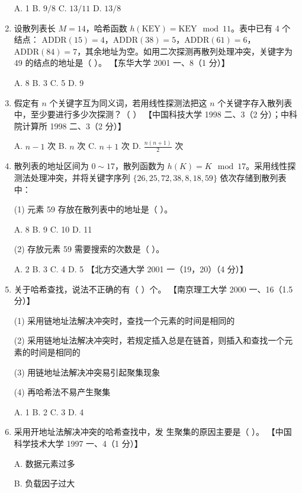 \documentclass[lang=cn,newtx,10pt,scheme=chinese]{../../elegantbook}
\begin{document}
\begin{enumerate}
    A. 1 \quad B. $9/8$ \quad C. $13/11$ \quad D. $13/8$  

    \item 设散列表长 $M = 14$，哈希函数 $h(\text{KEY}) = \text{KEY} \mod 11$。表中已有 4 个结点：  
    $\text{ADDR}(15) = 4$，$\text{ADDR}(38) = 5$，$\text{ADDR}(61) = 6$，$\text{ADDR}(84) = 7$，其余地址为空。如用二次探测再散列处理冲突，关键字为 49 的结点的地址是（ ）。  
    【东华大学 2001 一、8（1 分）】 

    A. 8 \quad B. 3 \quad C. 5 \quad D. 9  

    \item 假定有 $n$ 个关键字互为同义词，若用线性探测法把这 $n$ 个关键字存入散列表中，至少要进行多少次探测？（ ）  
    【中国科技大学 1998 二、3（2 分）；中科院计算所 1998 二、3（2 分）】  

    A. $n-1$ 次 \quad B. $n$ 次 \quad C. $n+1$ 次 \quad D. $\frac{n(n+1)}{2}$ 次  

    \item 散列表的地址区间为 $0 \sim 17$，散列函数为 $h(K) = K \mod 17$。采用线性探测法处理冲突，并将关键字序列 $\{26, 25, 72, 38, 8, 18, 59\}$ 依次存储到散列表中：  
    
    (1) 元素 59 存放在散列表中的地址是（ ）。 

    A. 8 \quad B. 9 \quad C. 10 \quad D. 11  
   
    (2) 存放元素 59 需要搜索的次数是（ ）。  
   
    A. 2 \quad B. 3 \quad C. 4 \quad D. 5  
    【北方交通大学 2001 一（19，20）（4 分）】  

    \item 关于哈希查找，说法不正确的有（ ）个。  
    【南京理工大学 2000 一、16（1.5 分）】  

    (1) 采用链地址法解决冲突时，查找一个元素的时间是相同的  

    (2) 采用链地址法解决冲突时，若规定插入总是在链首，则插入和查找一个元素的时间是相同的  

    (3) 用链地址法解决冲突易引起聚集现象  

    (4) 再哈希法不易产生聚集  

    A. 1 \quad B. 2 \quad C. 3 \quad D. 4  

    \item 采用开地址法解决冲突的哈希查找中，发
    生聚集的原因主要是（ ）。  
    【中国科学技术大学 1997 一、4（1 分）】  

    A. 数据元素过多  

    B. 负载因子过大  


\end{enumerate}
\end{document}
